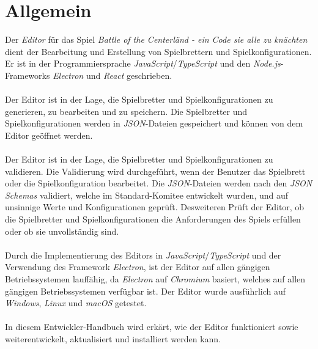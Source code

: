 \section{Allgemein}\label{sec:allgemein}

Der \emph{Editor} für das Spiel \emph{Battle of the Centerländ - ein Code sie alle zu knächten} dient der Bearbeitung und Erstellung von Spielbrettern und Spielkonfigurationen.
Er ist in der Programmiersprache \emph{JavaScript}/\emph{TypeScript} und den \emph{Node.js}-Frameworks \emph{Electron} und \emph{React} geschrieben.
\\\\
Der Editor ist in der Lage, die Spielbretter und Spielkonfigurationen zu generieren, zu bearbeiten und zu speichern.
Die Spielbretter und Spielkonfigurationen werden in \emph{JSON}-Dateien gespeichert und können von dem Editor geöffnet werden.
\\\\
Der Editor ist in der Lage, die Spielbretter und Spielkonfigurationen zu validieren.
Die Validierung wird durchgeführt, wenn der Benutzer das Spielbrett oder die Spielkonfiguration bearbeitet.
Die \emph{JSON}-Dateien werden nach den \emph{JSON Schemas} validiert, welche im Standard-Komitee entwickelt wurden, und auf unsinnige Werte und Konfigurationen geprüft.
Desweiteren Prüft der Editor, ob die Spielbretter und Spielkonfigurationen die Anforderungen des Spiels erfüllen oder ob sie unvollständig sind.
\\\\
Durch die Implementierung des Editors in \emph{JavaScript}/\emph{TypeScript} und der Verwendung des Framework \emph{Electron}, ist der Editor auf allen gängigen Betriebssystemen lauffähig, da \emph{Electron} auf \emph{Chromium} basiert, welches auf allen gängigen Betriebssystemen verfügbar ist.
Der Editor wurde ausführlich auf \emph{Windows}, \emph{Linux} und \emph{macOS} getestet.
\\\\
In diesem Entwickler-Handbuch wird erkärt, wie der Editor funktioniert sowie weiterentwickelt, aktualisiert und installiert werden kann.
